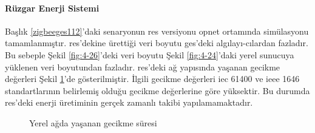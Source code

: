 \newpage
\paragraph{Rüzgar Enerji Sistemi}
Başlık \ref{zigbeeges112}'daki senaryonun \gls{res} versiyonu \gls{opnet} ortamında simülasyonu tamamlanmıştır. \gls{res}'dekine  ürettiği veri boyutu \gls{ges}'deki algılayı-cılardan fazladır. Bu sebeple Şekil \ref{fig:4-26}'deki veri boyutu Şekil \ref{fig:4-24}'daki yerel sunucuya yüklenen veri boyutundan fazladır. \gls{res}'deki ağ yapısında yaşanan gecikme değerleri Şekil \ref{fig:4-25}'de gösterilmiştir. İlgili gecikme değerleri \gls{iec} 61400 ve \gls{ieee} 1646 standartlarının belirlemiş olduğu gecikme değerlerine göre yüksektir. Bu durumda \gls{res}'deki enerji üretiminin gerçek zamanlı takibi yapılamamaktadır. 

\begin{figure}[htbp]
\centering



\caption{Yerel ağda yaşanan gecikme süresi}\label{fig:4-25}
\end{figure}

